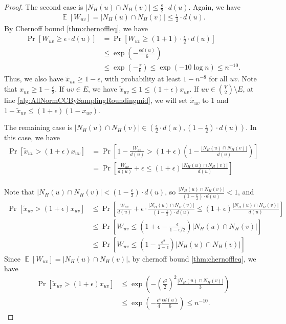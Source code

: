 \documentclass[11pt]{article}
\DeclareMathOperator*{\E}{{\mathbb{E}}}
\begin{document}
\begin{CJK*}{UTF8}{gbsn}
\begin{proof}
The second case is $|N_H(u) \cap N_H(v)| \leq \frac{\epsilon}{2} \cdot d(u)$. Again, we have 
\begin{align*}
    \E[W_{uv}] = |N_H(u) \cap N_H(v)| \leq \frac{\epsilon}{2} \cdot d(u).
\end{align*}
By Chernoff bound \ref{thm:chernoffleq}, we have
\begin{align*}
    \Pr[W_{uv} \geq \epsilon \cdot d(u)] &= \Pr[W_{uv} \geq (1 + 1) \cdot \frac{\epsilon}{2} \cdot d(u)] \\ 
    &\leq \exp \left(- \frac{\epsilon d(u)}{6} \right) \\
    &\leq \exp \left(- \frac{\tau}{6} \right) \leq \exp(-10\log n) \leq n^{-10}.
\end{align*}
Thus, we also have $\tilde{x}_{uv} \geq 1 - \epsilon$, with probability at least $1 - n^{-8}$ for all $uv$. Note that $x_{uv} \geq 1 - \frac{\epsilon}{2}$. If $uv \in E$, we have $\tilde{x}_{uv} \leq 1 \leq (1 + \epsilon) x_{uv}$. If $uv \in {V \choose 2} \setminus E$, at line \ref{alg:AllNormCCBySamplingRoundingmid}, we will set $\tilde{x}_{uv}$ to 1 and $1 - \tilde{x}_{uv} \leq (1 + \epsilon)(1 - x_{uv})$.

The remaining case is $|N_H(u) \cap N_H(v)| \in \left( \frac{\epsilon}{2} \cdot d(u), (1 - \frac{\epsilon}{2}) \cdot d(u) \right)$. In this case, we have
\begin{align*}
    \Pr[\tilde{x}_{uv} > (1 + \epsilon)x_{uv}] &= \Pr[1 - \frac{W_{uv}}{d(u)} > (1 + \epsilon)(1 - \frac{|N_H(u) \cap N_H(v)|}{d(u)})] \\
    &= \Pr[\frac{W_{uv}}{d(u)} + \epsilon \leq (1 + \epsilon) \frac{|N_H(u) \cap N_H(v)|}{d(u)}] \\
\end{align*}

Note that $|N_H(u) \cap N_H(v)| < (1 - \frac{\epsilon}{2}) \cdot d(u)$, so $\frac{|N_H(u) \cap N_H(v)|}{(1 - \frac{\epsilon}{2}) \cdot d(u)} < 1$, 
and
\begin{align*}
    \Pr[\tilde{x}_{uv} > (1 + \epsilon)x_{uv}] &\leq \Pr[\frac{W_{uv}}{d(u)} + \epsilon \cdot \frac{|N_H(u) \cap N_H(v)|}{(1 - \frac{\epsilon}{2}) \cdot d(u)} \leq (1 + \epsilon) \frac{|N_H(u) \cap N_H(v)|}{d(u)}] \\
    &\leq \Pr[W_{uv} \leq (1 + \epsilon - \frac{\epsilon}{1 - \epsilon/2}) |N_H(u) \cap N_H(v)|] \\
    &\leq \Pr[W_{uv} \leq (1 - \frac{\epsilon^2}{2 - \epsilon}) |N_H(u) \cap N_H(v)|] 
\end{align*}
Since $\E[W_{uv}] = |N_H(u) \cap N_H(v)|$, by chernoff bound \ref{thm:chernoffleq}, we have 
\begin{align*}
    \Pr[\tilde{x}_{uv} > (1 + \epsilon)x_{uv}] &\leq \exp\left( -\left(\frac{\epsilon^2}{2}\right)^2 \frac{|N_H(u) \cap N_H(v)|}{3}\right) \\
    &\leq \exp\left( -\frac{\epsilon^4}{4} \frac{\epsilon d(u)}{6}\right) \leq n^{-10}.
\end{align*}


\end{proof}
\end{CJK*}
\end{document}
